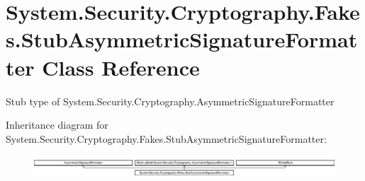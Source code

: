 \hypertarget{class_system_1_1_security_1_1_cryptography_1_1_fakes_1_1_stub_asymmetric_signature_formatter}{\section{System.\-Security.\-Cryptography.\-Fakes.\-Stub\-Asymmetric\-Signature\-Formatter Class Reference}
\label{class_system_1_1_security_1_1_cryptography_1_1_fakes_1_1_stub_asymmetric_signature_formatter}
}


Stub type of System.\-Security.\-Cryptography.\-Asymmetric\-Signature\-Formatter 


Inheritance diagram for System.\-Security.\-Cryptography.\-Fakes.\-Stub\-Asymmetric\-Signature\-Formatter\-:\begin{figure}[H]
\begin{center}
\leavevmode
\includegraphics[height=0.811594cm]{class_system_1_1_security_1_1_cryptography_1_1_fakes_1_1_stub_asymmetric_signature_formatter}
\end{center}
\end{figure}
